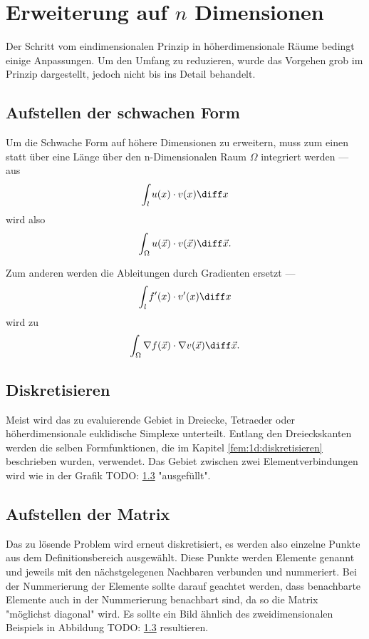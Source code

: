 %
%
%
%
\section{Erweiterung auf $n$ Dimensionen\label{fem:erweiterung_nD}}
Der Schritt vom eindimensionalen Prinzip in höherdimensionale Räume bedingt einige Anpassungen. 
Um den Umfang zu reduzieren, wurde das Vorgehen grob im Prinzip dargestellt, jedoch nicht bis ins Detail behandelt.

\subsection{Aufstellen der schwachen Form}
Um die Schwache Form auf höhere Dimensionen zu erweitern, muss zum einen statt über eine Länge über den n-Dimensionalen Raum $\Omega$ integriert werden --- aus 
\begin{equation}
    \int_{l} u(x) \cdot v(x) \diff x
\end{equation}
wird also
\begin{equation}
    \int_{\Omega} u(\vec{x}) \cdot v(\vec{x}) \diff \vec{x}.
\end{equation}

Zum anderen werden die Ableitungen durch Gradienten ersetzt ---
\begin{equation}
    \int_{l} f'(x) \cdot v'(x) \diff x
\end{equation}
wird zu
\begin{equation}
    \int_{\Omega} \nabla f(\vec{x}) \cdot \nabla v(\vec{x}) \diff \vec{x}.
\end{equation}

\subsection{Diskretisieren}
Meist wird das zu evaluierende Gebiet in Dreiecke, Tetraeder oder höherdimensionale euklidische Simplexe unterteilt. 
Entlang den Dreieckskanten werden die selben Formfunktionen, die im Kapitel \ref{fem:1d:diskretisieren} beschrieben wurden, verwendet.
Das Gebiet zwischen zwei Elementverbindungen wird wie in der Grafik TODO: \ref{} "ausgefüllt".

\subsection{Aufstellen der Matrix}
Das zu lösende Problem wird erneut diskretisiert, es werden also einzelne Punkte aus dem Definitionsbereich ausgewählt.
Diese Punkte werden Elemente genannt und jeweils mit den nächstgelegenen Nachbaren verbunden und nummeriert. 
Bei der Nummerierung der Elemente sollte darauf geachtet werden, dass benachbarte Elemente auch in der Nummerierung benachbart sind, da so die Matrix "möglichst diagonal" wird. %
Es sollte ein Bild ähnlich des zweidimensionalen Beispiels in Abbildung TODO: \ref{} resultieren. %

